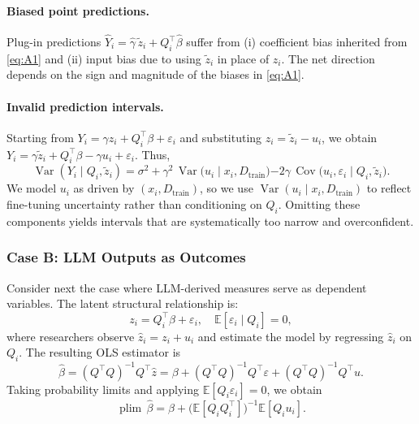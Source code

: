 \documentclass[11pt]{article}
\begin{document}
\paragraph{Biased point predictions.}
Plug-in predictions $\hat Y_i = \hat\gamma\, \tilde z_i + Q_i^\top \hat\beta$ suffer from (i) coefficient bias inherited from \eqref{eq:A1} and (ii) input bias due to using $\tilde z_i$ in place of $z_i$.
The net direction depends on the sign and magnitude of the biases in \eqref{eq:A1}.

\paragraph{Invalid prediction intervals.}
Starting from $Y_i=\gamma z_i + Q_i^\top\beta + \varepsilon_i$ and substituting $z_i=\tilde z_i - u_i$, we obtain
$Y_i = \gamma \tilde z_i + Q_i^\top \beta - \gamma u_i + \varepsilon_i$.
Thus,
\begin{equation}
\operatorname{Var}(Y_i \mid Q_i,\tilde z_i)
=
\sigma^2
+
\gamma^2\,\operatorname{Var}\!\big(u_i \mid x_i, D_{\text{train}}\big)
\boldsymbol{-}
2\gamma\,\operatorname{Cov}\!\big(u_i,\varepsilon_i \mid Q_i,\tilde z_i\big).
\tag{A3}
\end{equation}
We model $u_i$ as driven by $(x_i, D_{\text{train}})$, so we use $\operatorname{Var}(u_i \mid x_i, D_{\text{train}})$ to reflect fine-tuning uncertainty rather than conditioning on $Q_i$.
Omitting these components yields intervals that are systematically too narrow and overconfident.

\subsubsection{Case B: LLM Outputs as Outcomes}  

Consider next the case where LLM-derived measures serve as dependent variables. The latent structural relationship is:
\begin{equation}
z_i = Q_i^\top \beta + \varepsilon_i, \quad \mathbb{E}[\varepsilon_i \mid Q_i] = 0,
\end{equation}
where researchers observe $\hat{z}_i = z_i + u_i$ and estimate the model by regressing $\hat{z}_i$ on $Q_i$.  
The resulting OLS estimator is
\begin{equation}
\hat{\beta} = (Q^\top Q)^{-1}Q^\top \hat{z} 
= \beta + (Q^\top Q)^{-1}Q^\top \varepsilon + (Q^\top Q)^{-1}Q^\top u. 
\end{equation}
Taking probability limits and applying $\mathbb{E}[Q_i \varepsilon_i]=0$, we obtain
\begin{equation}
\operatorname{plim}\,\hat{\beta} 
= \beta + \big(\mathbb{E}[Q_i Q_i^\top]\big)^{-1}\mathbb{E}[Q_i u_i]. 
\tag{B1}\label{eq:B1}
\end{equation}
\end{document}
